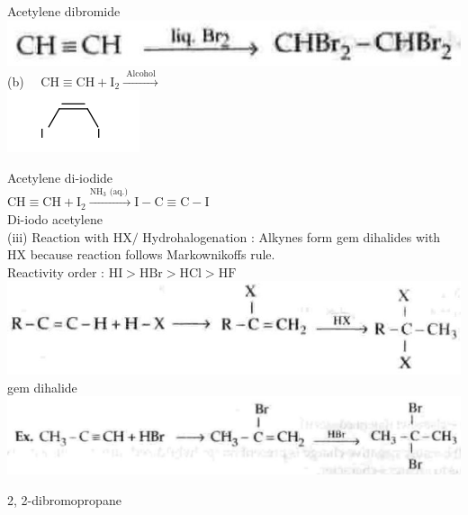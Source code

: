 \documentclass[10pt]{article}
\begin{document}
Acetylene dibromide\\
\includegraphics[max width=\textwidth, center]{2025_01_28_8470952b98110cec3aabg-189}\\
(b) $\quad \mathrm{CH} \equiv \mathrm{CH}+\mathrm{I}_{2} \xrightarrow{\text { Alcohol }}$\\
\includegraphics{smile-1006579a71dbac291a095665a4f1e49972220c0d}

Acetylene di-iodide\\
$\mathrm{CH} \equiv \mathrm{CH}+\mathrm{I}_{2} \xrightarrow{\mathrm{NH}_{3} \text { (aq.) }} \mathrm{I}-\mathrm{C} \equiv \mathrm{C}-\mathrm{I}$\\
Di-iodo acetylene\\
(iii) Reaction with $\mathrm{HX} /$ Hydrohalogenation : Alkynes form gem dihalides with HX because reaction follows Markownikoffs rule.\\
Reactivity order : $\mathrm{HI}>\mathrm{HBr}>\mathrm{HCl}>\mathrm{HF}$\\
\includegraphics[max width=\textwidth, center]{2025_01_28_8470952b98110cec3aabg-190(2)}\\
gem dihalide\\
\includegraphics[max width=\textwidth, center]{2025_01_28_8470952b98110cec3aabg-190(6)}

2, 2-dibromopropane
\end{document}
